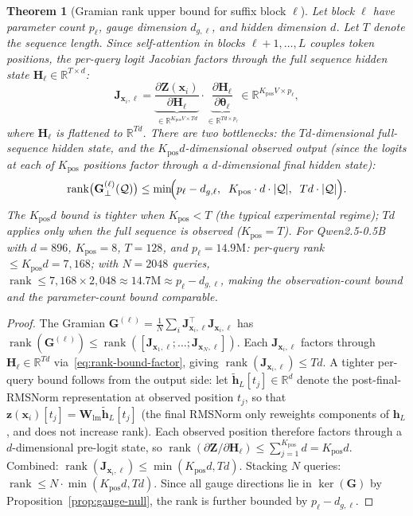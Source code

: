 \documentclass{article}
\newtheorem{theorem}{Theorem}
\newcommand{\R}{\mathbb{R}}
\newcommand{\cQ}{\mathcal{Q}}
\newcommand{\btheta}{\boldsymbol{\theta}}
\newcommand{\bz}{\mathbf{z}}
\newcommand{\bh}{\mathbf{h}}
\newcommand{\bx}{\mathbf{x}}
\newcommand{\bW}{\mathbf{W}}
\newcommand{\bJ}{\mathbf{J}}
\newcommand{\bG}{\mathbf{G}}
\newcommand{\bH}{\mathbf{H}}
\newcommand{\bZ}{\mathbf{Z}}
\DeclareMathOperator{\rank}{rank}
\begin{document}
\begin{theorem}[Gramian rank upper bound for suffix block $\ell$]
\label{thm:rank-bound}
Let block $\ell$ have parameter count $p_\ell$, gauge dimension $d_{g,\ell}$, and hidden dimension $d$.  Let $T$ denote the sequence length.  Since self-attention in blocks $\ell+1, \ldots, L$ couples token positions, the per-query logit Jacobian factors through the \emph{full sequence} hidden state $\bH_\ell \in \R^{T \times d}$:
\begin{equation}\label{eq:rank-bound-factor}
    \bJ_{\bx_i,\ell} = \underbrace{\frac{\partial \bZ(\bx_i)}{\partial \bH_\ell}}_{\in \R^{K_\text{pos} V \times Td}} \cdot \underbrace{\frac{\partial \bH_\ell}{\partial \btheta_\ell}}_{\in \R^{Td \times p_\ell}} \in \R^{K_\text{pos} V \times p_\ell},
\end{equation}
where $\bH_\ell$ is flattened to $\R^{Td}$.  There are two bottlenecks: the $Td$-dimensional full-sequence hidden state, and the $K_\text{pos} d$-dimensional observed output (since the logits at each of $K_\text{pos}$ positions factor through a $d$-dimensional final hidden state):
\begin{equation}\label{eq:rank-bound}
    \rank\bigl(\bG_\perp^{(\ell)}(\cQ)\bigr) \leq \min\!\Bigl(p_\ell - d_{g,\ell},\;\; K_\text{pos} \cdot d \cdot |\cQ|,\;\; Td \cdot |\cQ|\Bigr).
\end{equation}
The $K_\text{pos} d$ bound is tighter when $K_\text{pos} < T$ (the typical experimental regime); $Td$ applies only when the full sequence is observed ($K_\text{pos} = T$).  For Qwen2.5-0.5B with $d=896$, $K_\text{pos}=8$, $T=128$, and $p_\ell = 14.9\text{M}$: per-query rank $\leq K_\text{pos} d = 7{,}168$; with $N = 2048$ queries, $\rank \leq 7{,}168 \times 2{,}048 \approx 14.7\text{M} \approx p_\ell - d_{g,\ell}$, making the observation-count bound and the parameter-count bound comparable.
\end{theorem}
\begin{proof}
The Gramian $\bG^{(\ell)} = \frac{1}{N}\sum_i \bJ_{\bx_i,\ell}^\top \bJ_{\bx_i,\ell}$ has $\rank(\bG^{(\ell)}) \leq \rank([\bJ_{\bx_1,\ell}; \ldots; \bJ_{\bx_N,\ell}])$.  Each $\bJ_{\bx_i,\ell}$ factors through $\bH_\ell \in \R^{Td}$ via~\eqref{eq:rank-bound-factor}, giving $\rank(\bJ_{\bx_i,\ell}) \leq Td$.  A tighter per-query bound follows from the output side: let $\tilde{\bh}_L[t_j] \in \R^d$ denote the post-final-RMSNorm representation at observed position $t_j$, so that $\bz(\bx_i)[t_j] = \bW_\text{lm}\tilde{\bh}_L[t_j]$ (the final RMSNorm only reweights components of $\bh_L$, and does not increase rank).  Each observed position therefore factors through a $d$-dimensional pre-logit state, so $\rank(\partial \bZ / \partial \bH_\ell) \leq \sum_{j=1}^{K_\text{pos}} d = K_\text{pos} d$.  Combined: $\rank(\bJ_{\bx_i,\ell}) \leq \min(K_\text{pos} d, Td)$.  Stacking $N$ queries: $\rank \leq N \cdot \min(K_\text{pos} d, Td)$.  Since all gauge directions lie in $\ker(\bG)$ by Proposition~\ref{prop:gauge-null}, the rank is further bounded by $p_\ell - d_{g,\ell}$.
\end{proof}
\end{document}
